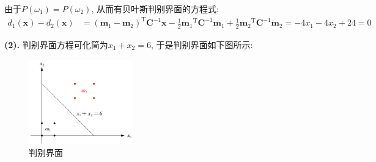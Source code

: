 \documentclass{article}
\begin{document}
\begin{homeworkProblem}
	由于$P(\omega_1)=P(\omega_2)$, 从而有贝叶斯判别界面的方程式:
	\begin{align}
		d_1\left( \boldsymbol{x} \right) -d_2\left( \boldsymbol{x} \right) &=\left( \boldsymbol{m}_1-\boldsymbol{m}_2 \right) ^{\mathrm{T}}\boldsymbol{C}^{-1}\boldsymbol{x}-\frac{1}{2}{\boldsymbol{m}_1}^{\mathrm{T}}\boldsymbol{C}^{-1}\boldsymbol{m}_1+\frac{1}{2}{\boldsymbol{m}_2}^{\mathrm{T}}\boldsymbol{C}^{-1}\boldsymbol{m}_2=-4x_1-4x_2+24=0
	\end{align}

	\textbf{(2).} 判别界面方程可化简为$x_1+x_2=6$, 于是判别界面如下图所示:
	\begin{figure}[H]  %
		\centering
		\includegraphics[width=0.4\textwidth]{images/title/判别界面.pdf}
		\caption{判别界面}
		\label{fig:判别界面}
	\end{figure}
\end{homeworkProblem}

\pagebreak
\end{document}
